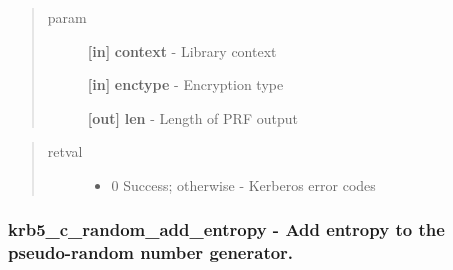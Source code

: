 \documentclass[letterpaper,10pt,english]{sphinxmanual}
\begin{document}
\begin{quote}\begin{description}
\item[{param}] \leavevmode
\textbf{{[}in{]}} \textbf{context} - Library context

\textbf{{[}in{]}} \textbf{enctype} - Encryption type

\textbf{{[}out{]}} \textbf{len} - Length of PRF output

\end{description}\end{quote}
\begin{quote}\begin{description}
\item[{retval}] \leavevmode\begin{itemize}
\item {} 
0   Success; otherwise - Kerberos error codes

\end{itemize}

\end{description}\end{quote}


\subsubsection{krb5\_c\_random\_add\_entropy -  Add entropy to the pseudo-random number generator.}
\label{appdev/refs/api/krb5_c_random_add_entropy::doc}\label{appdev/refs/api/krb5_c_random_add_entropy:krb5-c-random-add-entropy-add-entropy-to-the-pseudo-random-number-generator}

\begin{fulllineitems}
\label{appdev/refs/api/krb5_c_random_add_entropy:c.krb5_c_random_add_entropy}
\end{fulllineitems}
\end{document}
